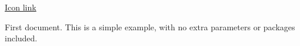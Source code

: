\documentclass{article}
\begin{document}
\href{https://www.flaticon.com/free-icon/neural_2103658?related_id=2103633&origin=search#}{Icon link}

First document. This is a simple example, with no 
extra parameters or packages included.
\end{document}
